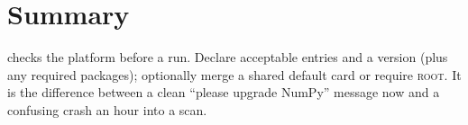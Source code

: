 \section{Summary}
\label{sec:env-summary}

 checks the platform before a run. Declare acceptable  entries and a
 version (plus any required packages); optionally merge a shared default card or
require \textsc{root}. It is the difference between a clean ``please upgrade NumPy'' message now
and a confusing crash an hour into a scan.
